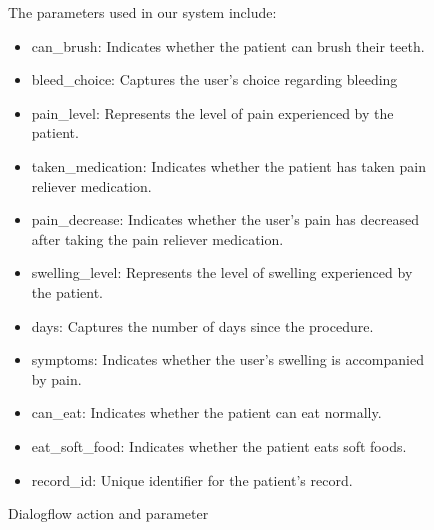 \documentclass[12pt,oneside,openright,a4paper]{cpe-english-project}
\begin{document}
          \begin{figure}[H]
            \centering
            \caption{Dialogflow action and parameter}\label{fig:dialogflow-actionandparameter}
            \begin{justify}
              \qquad The parameters used in our system include:\par
              \begin{itemize}
                \item can\_brush: Indicates whether the patient can brush their teeth.
                \item bleed\_choice: Captures the user's choice regarding bleeding
                \item pain\_level: Represents the level of pain experienced by the patient.
                \item taken\_medication: Indicates whether the patient has taken pain reliever medication.
                \item pain\_decrease: Indicates whether the user’s pain has decreased after taking the pain reliever medication.
                \item swelling\_level: Represents the level of swelling experienced by the patient.
                \item days: Captures the number of days since the procedure.
                \item symptoms: Indicates whether the user's swelling is accompanied by pain.
                \item can\_eat: Indicates whether the patient can eat normally.
                \item eat\_soft\_food: Indicates whether the patient eats soft foods.
                \item record\_id: Unique identifier for the patient's record.
              \end{itemize}
              \makeatletter

\end{justify}
\end{figure}
\end{document}
